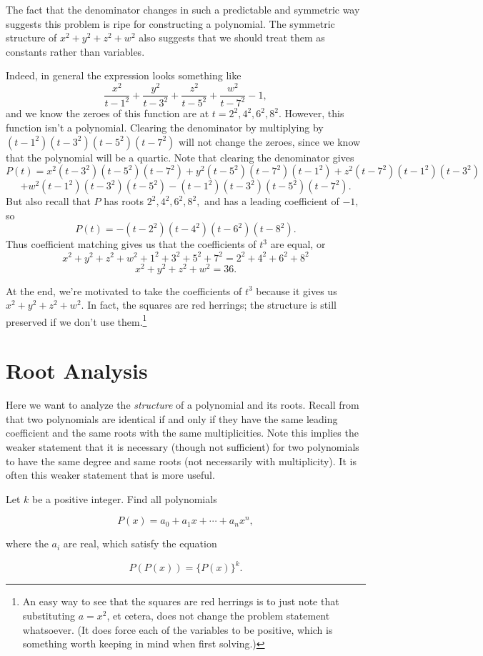 \documentclass{article}
\begin{document}
\begin{sol}
The fact that the denominator changes in such a predictable and symmetric way suggests this problem is ripe for constructing a polynomial. The symmetric structure of $x^2+y^2+z^2+w^2$ also suggests that we should treat them as constants rather than variables.

Indeed, in general the expression looks something like
\[\frac{x^2}{t-1^2}+\frac{y^2}{t-3^2}+\frac{z^2}{t-5^2}+\frac{w^2}{t-7^2}-1,\]
and we know the zeroes of this function are at $t=2^2,4^2,6^2,8^2.$ However, this function isn't a polynomial. Clearing the denominator by multiplying by $(t-1^2)(t-3^2)(t-5^2)(t-7^2)$ will not change the zeroes, since we know that the polynomial will be a quartic. Note that clearing the denominator gives
\[P(t)=x^2(t-3^2)(t-5^2)(t-7^2)+y^2(t-5^2)(t-7^2)(t-1^2)+z^2(t-7^2)(t-1^2)(t-3^2)\]
\[+w^2(t-1^2)(t-3^2)(t-5^2)-(t-1^2)(t-3^2)(t-5^2)(t-7^2).\]
But also recall that $P$ has roots $2^2,4^2,6^2,8^2,$ and has a leading coefficient of $-1,$ so
\[P(t)=-(t-2^2)(t-4^2)(t-6^2)(t-8^2).\]
Thus coefficient matching gives us that the coefficients of $t^3$ are equal, or
\[x^2+y^2+z^2+w^2+1^2+3^2+5^2+7^2=2^2+4^2+6^2+8^2\]
\[x^2+y^2+z^2+w^2=36.\]
\end{sol}

At the end, we're motivated to take the coefficients of $t^3$ because it gives us $x^2+y^2+z^2+w^2.$ In fact, the squares are red herrings; the structure is still preserved if we don't use them.\footnote{An easy way to see that the squares are red herrings is to just note that substituting $a=x^2$, et cetera, does not change the problem statement whatsoever. (It does force each of the variables to be positive, which is something worth keeping in mind when first solving.)}

\section{Root Analysis}

Here we want to analyze the \textit{structure} of a polynomial and its roots. Recall from  that two polynomials are identical if and only if they have the same leading coefficient and the same roots with the same multiplicities. Note this implies the weaker statement that it is necessary (though not sufficient) for two polynomials to have the same degree and same roots (not necessarily with multiplicity). It is often this weaker statement that is more useful.

\begin{exam}[Canada]
Let $ k$ be a positive integer. Find all polynomials

\[ P(x) = a_0 + a_1 x + \cdots + a_n x^n,\]

where the $ a_i$ are real, which satisfy the equation

\[P(P(x)) = \{ P(x) \}^k.\]
\end{exam}
\end{document}
